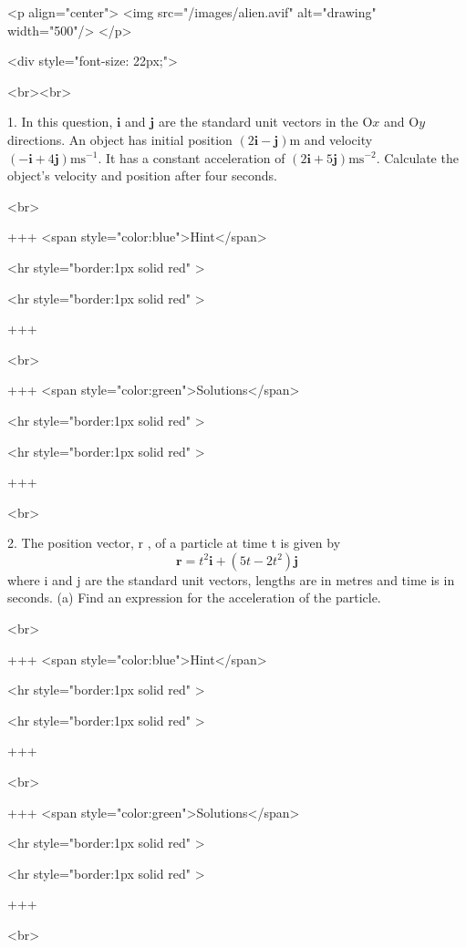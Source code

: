 <p align="center">
<img src="/images/alien.avif" alt="drawing" width="500"/>
</p>

<div style="font-size: 22px;">

<br><br>

1. In this question, $\mathbf{i}$ and $\mathbf{j}$ are the standard unit vectors in the $\mathrm{O} x$ and $\mathrm{O} y$ directions. An object has initial position $(2 \mathbf{i}-\mathbf{j}) \mathrm{m}$ and velocity $(-\mathbf{i}+4 \mathbf{j}) \mathrm{ms}^{-1}$. It has a constant acceleration of $(2 \mathbf{i}+5 \mathbf{j}) \mathrm{ms}^{-2}$.
Calculate the object's velocity and position after four seconds.

<br>

+++ <span style="color:blue">Hint</span>

<hr style="border:1px solid red" >

<hr style="border:1px solid red" >

+++

<br>

+++ <span style="color:green">Solutions</span>

<hr style="border:1px solid red" >

<hr style="border:1px solid red" >

+++

<br>

2. The position vector, r , of a particle at time t is given by
$$
\mathbf{r}=t^{2} \mathbf{i}+\left(5 t-2 t^{2}\right) \mathbf{j}
$$
where i and j are the standard unit vectors, lengths are in metres and time is in seconds.
(a) Find an expression for the acceleration of the particle.

<br>

+++ <span style="color:blue">Hint</span>

<hr style="border:1px solid red" >

<hr style="border:1px solid red" >

+++

<br>

+++ <span style="color:green">Solutions</span>

<hr style="border:1px solid red" >

<hr style="border:1px solid red" >

+++

<br>

